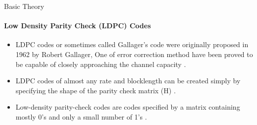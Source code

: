 \documentclass{beamer}
\begin{document}
\begin{frame}[shrink=23]{Basic Theory}
\framesubtitle{Low Density Parity Check (LDPC) Codes}
\begin{itemize}
\justifying
\item LDPC codes or sometimes called Gallager’s code were originally proposed in 1962 by Robert Gallager, One of error correction method have been proved to be capable of closely approaching the channel capacity \footnotemark[1].\\
\item LDPC codes of almost any rate and blocklength can be created simply by specifying the shape of the parity check matrix (H) \footnotemark[1].\\
\item Low-density parity-check codes are codes specified by a matrix containing mostly 0’s and only a small number of 1’s \footnotemark[2].\\


\end{itemize}
\end{frame}
\end{document}
